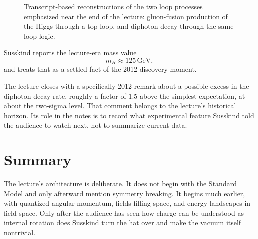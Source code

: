 \begin{figure}
\centering
{}
\caption{Transcript-based reconstructions of the two loop processes emphasized near the end of the lecture: gluon-fusion production of the Higgs through a top loop, and diphoton decay through the same loop logic.}
\end{figure}

Susskind reports the lecture-era mass value
\begin{equation}
m_{H}\approx 125\,\mathrm{GeV},
\end{equation}
and treats that as a settled fact of the 2012 discovery moment.

\begin{remark}
The lecture closes with a specifically 2012 remark about a possible excess in the diphoton decay rate, roughly a factor of \(1.5\) above the simplest expectation, at about the two-sigma level. That comment belongs to the lecture's historical horizon. Its role in the notes is to record what experimental feature Susskind told the audience to watch next, not to summarize current data.
\end{remark}

\section{Summary}

The lecture's architecture is deliberate. It does not begin with the Standard Model and only afterward mention symmetry breaking. It begins much earlier, with quantized angular momentum, fields filling space, and energy landscapes in field space. Only after the audience has seen how charge can be understood as internal rotation does Susskind turn the hat over and make the vacuum itself nontrivial.

